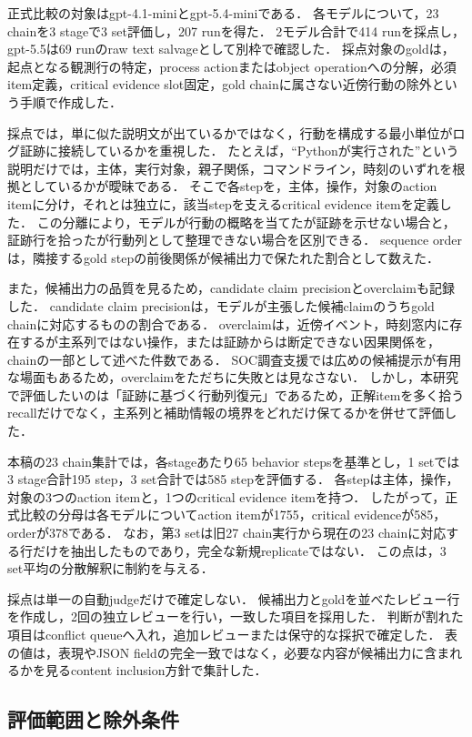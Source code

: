 \documentclass[dvipdfmx]{FITpaper}
\newcommand{\model}[1]{\mbox{\textrm{#1}}}
\begin{document}
正式比較の対象は\model{gpt-4.1-mini}と\model{gpt-5.4-mini}である．
各モデルについて，23 chainを3 stageで3 set評価し，207 runを得た．
2モデル合計で414 runを採点し，\model{gpt-5.5}は69 runのraw text salvageとして別枠で確認した．
採点対象のgoldは，起点となる観測行の特定，process actionまたはobject operationへの分解，必須item定義，critical evidence slot固定，gold chainに属さない近傍行動の除外という手順で作成した．

採点では，単に似た説明文が出ているかではなく，行動を構成する最小単位がログ証跡に接続しているかを重視した．
たとえば，``Pythonが実行された''という説明だけでは，主体，実行対象，親子関係，コマンドライン，時刻のいずれを根拠としているかが曖昧である．
そこで各stepを，主体，操作，対象のaction itemに分け，それとは独立に，該当stepを支えるcritical evidence itemを定義した．
この分離により，モデルが行動の概略を当てたが証跡を示せない場合と，証跡行を拾ったが行動列として整理できない場合を区別できる．
sequence orderは，隣接するgold stepの前後関係が候補出力で保たれた割合として数えた．

また，候補出力の品質を見るため，candidate claim precisionとoverclaimも記録した．
candidate claim precisionは，モデルが主張した候補claimのうちgold chainに対応するものの割合である．
overclaimは，近傍イベント，時刻窓内に存在するが主系列ではない操作，または証跡からは断定できない因果関係を，chainの一部として述べた件数である．
SOC調査支援では広めの候補提示が有用な場面もあるため，overclaimをただちに失敗とは見なさない．
しかし，本研究で評価したいのは「証跡に基づく行動列復元」であるため，正解itemを多く拾うrecallだけでなく，主系列と補助情報の境界をどれだけ保てるかを併せて評価した．

本稿の23 chain集計では，各stageあたり65 behavior stepsを基準とし，1 setでは3 stage合計195 step，3 set合計では585 stepを評価する．
各stepは主体，操作，対象の3つのaction itemと，1つのcritical evidence itemを持つ．
したがって，正式比較の分母は各モデルについてaction itemが1755，critical evidenceが585，orderが378である．
なお，第3 setは旧27 chain実行から現在の23 chainに対応する行だけを抽出したものであり，完全な新規replicateではない．
この点は，3 set平均の分散解釈に制約を与える．

採点は単一の自動judgeだけで確定しない．
候補出力とgoldを並べたレビュー行を作成し，2回の独立レビューを行い，一致した項目を採用した．
判断が割れた項目はconflict queueへ入れ，追加レビューまたは保守的な採択で確定した．
表の値は，表現やJSON fieldの完全一致ではなく，必要な内容が候補出力に含まれるかを見るcontent inclusion方針で集計した．

\subsection{評価範囲と除外条件}
\end{document}
